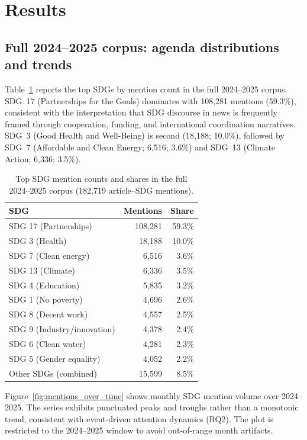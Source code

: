 \documentclass[11pt]{article}
\begin{document}
\section{Results}
\subsection{Full 2024--2025 corpus: agenda distributions and trends}
Table~\ref{tab:sdg_counts_full} reports the top SDGs by mention count in the full 2024--2025 corpus. SDG~17 (Partnerships for the Goals) dominates with 108{,}281 mentions (59.3\%), consistent with the interpretation that SDG discourse in news is frequently framed through cooperation, funding, and international coordination narratives. SDG~3 (Good Health and Well-Being) is second (18{,}188; 10.0\%), followed by SDG~7 (Affordable and Clean Energy; 6{,}516; 3.6\%) and SDG~13 (Climate Action; 6{,}336; 3.5\%).

\begin{table}[H]
\centering
\caption{Top SDG mention counts and shares in the full 2024--2025 corpus (182{,}719 article--SDG mentions).}
\label{tab:sdg_counts_full}
\begin{tabular}{lrr}
\toprule
SDG & Mentions & Share \\
\midrule
SDG 17 (Partnerships) & 108{,}281 & 59.3\% \\
SDG 3 (Health) & 18{,}188 & 10.0\% \\
SDG 7 (Clean energy) & 6{,}516 & 3.6\% \\
SDG 13 (Climate) & 6{,}336 & 3.5\% \\
SDG 4 (Education) & 5{,}835 & 3.2\% \\
SDG 1 (No poverty) & 4{,}696 & 2.6\% \\
SDG 8 (Decent work) & 4{,}557 & 2.5\% \\
SDG 9 (Industry/innovation) & 4{,}378 & 2.4\% \\
SDG 6 (Clean water) & 4{,}281 & 2.3\% \\
SDG 5 (Gender equality) & 4{,}052 & 2.2\% \\
Other SDGs (combined) & 15{,}599 & 8.5\% \\
\bottomrule
\end{tabular}
\end{table}

Figure~\ref{fig:mentions_over_time} shows monthly SDG mention volume over 2024--2025. The series exhibits punctuated peaks and troughs rather than a monotonic trend, consistent with event-driven attention dynamics (RQ2). The plot is restricted to the 2024--2025 window to avoid out-of-range month artifacts.
\end{document}
